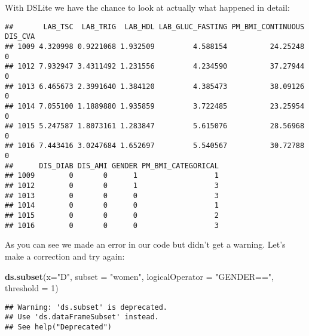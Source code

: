 \documentclass[
]{book}
\newenvironment{Shaded}{\begin{snugshade}}{\end{snugshade}}
\newcommand{\DataTypeTok}[1]{\textcolor[rgb]{0.13,0.29,0.53}{#1}}
\newcommand{\DecValTok}[1]{\textcolor[rgb]{0.00,0.00,0.81}{#1}}
\newcommand{\KeywordTok}[1]{\textcolor[rgb]{0.13,0.29,0.53}{\textbf{#1}}}
\newcommand{\NormalTok}[1]{#1}
\newcommand{\OperatorTok}[1]{\textcolor[rgb]{0.81,0.36,0.00}{\textbf{#1}}}
\newcommand{\StringTok}[1]{\textcolor[rgb]{0.31,0.60,0.02}{#1}}
\begin{document}
With DSLite we have the chance to look at actually what happened in detail:

\begin{Shaded}
\end{Shaded}

\begin{verbatim}
##       LAB_TSC  LAB_TRIG  LAB_HDL LAB_GLUC_FASTING PM_BMI_CONTINUOUS DIS_CVA
## 1009 4.320998 0.9221068 1.932509         4.588154          24.25248       0
## 1012 7.932947 3.4311492 1.231556         4.234590          37.27944       0
## 1013 6.465673 2.3991640 1.384120         4.385473          38.09126       0
## 1014 7.055100 1.1889880 1.935859         3.722485          23.25954       0
## 1015 5.247587 1.8073161 1.283847         5.615076          28.56968       0
## 1016 7.443416 3.0247684 1.652697         5.540567          30.72788       0
##      DIS_DIAB DIS_AMI GENDER PM_BMI_CATEGORICAL
## 1009        0       0      1                  1
## 1012        0       0      1                  3
## 1013        0       0      0                  3
## 1014        0       0      0                  1
## 1015        0       0      0                  2
## 1016        0       0      0                  3
\end{verbatim}

As you can see we made an error in our code but didn't get a warning. Let's make a correction and try again:

\begin{Shaded}
\begin{Highlighting}[]
\KeywordTok{ds.subset}\NormalTok{(}\DataTypeTok{x=}\StringTok{"D"}\NormalTok{, }\DataTypeTok{subset =} \StringTok{"women"}\NormalTok{, }\DataTypeTok{logicalOperator =} \StringTok{"GENDER=="}\NormalTok{, }\DataTypeTok{threshold =} \DecValTok{1}\NormalTok{)}
\end{Highlighting}
\end{Shaded}

\begin{verbatim}
## Warning: 'ds.subset' is deprecated.
## Use 'ds.dataFrameSubset' instead.
## See help("Deprecated")
\end{verbatim}
\end{document}
